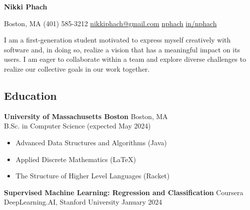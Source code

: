 \documentclass[11pt, letterpaper]{article}
\begin{document}
\begin{center}
    {\huge \textbf{Nikki Phach}}
    
    \vspace{5mm}

    \begin{footnotesize}
    \mbox{} \xdotfill[.5ex]{.4pt} \enspace
    {\color{accent} }
    \enspace Boston, MA \quad\textbar\quad
    {\color{accent} }
    \enspace (401) 585-3212 \quad\textbar\quad
    \href{mailto:nikkiphach@gmail.com}{{\color{accent} } \enspace nikkiphach@gmail.com} \quad\textbar\quad
    \href{https://github.com/nphach}{{\color{accent} } \enspace nphach}
    \quad\textbar\quad
    \href{https://www.linkedin.com/in/nikki-phach-a269172aa/}{{\color{accent} } \enspace in/nphach}
    \enspace \xdotfill[.5ex]{.4pt}
    \end{footnotesize}
    
\end{center}

    \noindent I am a first-generation student motivated to express myself creatively with software and, in doing so, realize a vision that has a meaningful impact on its users. I am eager to collaborate within a team and explore diverse challenges to realize our collective goals in our work together.

\subsection*{\color{accent} Education \xdotfill[.5ex]{.4pt}}
\textbf{University of Massachusetts Boston} \hfill Boston, MA \\
B.Sc. in Computer Science \hfill (expected May 2024)
\begin{itemize}[noitemsep]
\item Advanced Data Structures and Algorithms (Java)
\item Applied Discrete Mathematics (\LaTeX)
\item The Structure of Higher Level Languages (Racket)
\end{itemize}
\textbf{Supervised Machine Learning: Regression and Classification} \hfill Coursera \\
DeepLearning.AI, Stanford University \hfill January 2024
\end{document}

